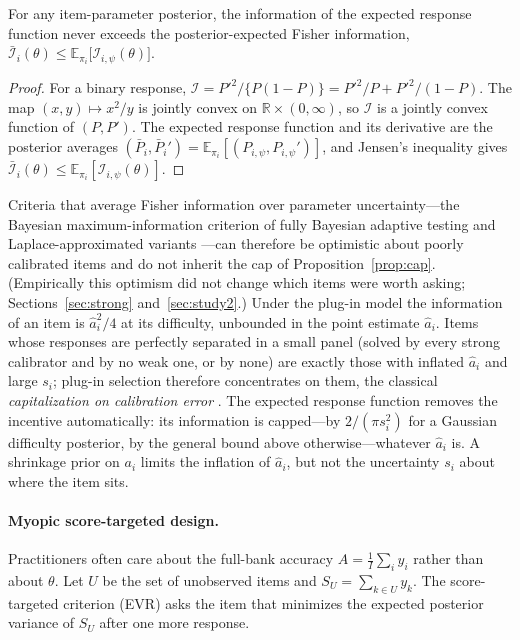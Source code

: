 \begin{corollary}\label{cor:jensen}
For any item-parameter posterior, the information of the expected response
function never exceeds the posterior-expected Fisher information,
$\bar{\mathcal I}_i(\theta)\le\mathbb E_{\pi_i}\big[\mathcal I_{i,\psi}(\theta)\big]$.
\end{corollary}

\begin{proof}
For a binary response, $\mathcal I=P'^2/\{P(1-P)\}=P'^2/P+P'^2/(1-P)$. The
map $(x,y)\mapsto x^2/y$ is jointly convex on $\mathbb R\times(0,\infty)$, so
$\mathcal I$ is a jointly convex function of $(P,P')$. The expected response
function and its derivative are the posterior averages
$(\bar P_i,\bar P_i')=\mathbb E_{\pi_i}[(P_{i,\psi},P_{i,\psi}')]$, and Jensen's inequality
gives $\bar{\mathcal I}_i(\theta)\le\mathbb E_{\pi_i}[\mathcal I_{i,\psi}(\theta)]$.
\end{proof}

Criteria that average Fisher information over parameter uncertainty---the Bayesian
maximum-information criterion of fully Bayesian adaptive testing
\citep{vanderlinden2020fast,fink2025accounting} and Laplace-approximated variants
\citep{mandujano2026laplace}---can therefore be optimistic about poorly calibrated items
and do not inherit the cap of Proposition~\ref{prop:cap}. (Empirically this optimism did
not change which items were worth asking; Sections~\ref{sec:strong} and~\ref{sec:study2}.)
Under the plug-in model the information of an item is $\hat a_i^2/4$ at its
difficulty, unbounded in the point estimate $\hat a_i$. Items whose responses
are perfectly separated in a small panel (solved by every strong calibrator and
by no weak one, or by none) are exactly those with inflated $\hat a_i$ and large
$s_i$; plug-in selection therefore concentrates on them, the classical
\emph{capitalization on calibration error} \citep{vanderlinden2000capitalization,patton2013influence}.
The expected response function removes the incentive automatically: its information is
capped---by $2/(\pi s_i^2)$ for a Gaussian difficulty posterior, by the general bound above
otherwise---whatever $\hat a_i$ is. A shrinkage prior on $a_i$ limits the
inflation of $\hat a_i$, but not the uncertainty $s_i$ about where the item sits.

\paragraph{Myopic score-targeted design.}
Practitioners often care about the full-bank accuracy $A=\frac1I\sum_iy_i$
rather than about $\theta$. Let $U$ be the set of unobserved items and
$S_U=\sum_{k\in U}y_k$. The score-targeted criterion (EVR) asks the item that
minimizes the expected posterior variance of $S_U$ after one more response.

